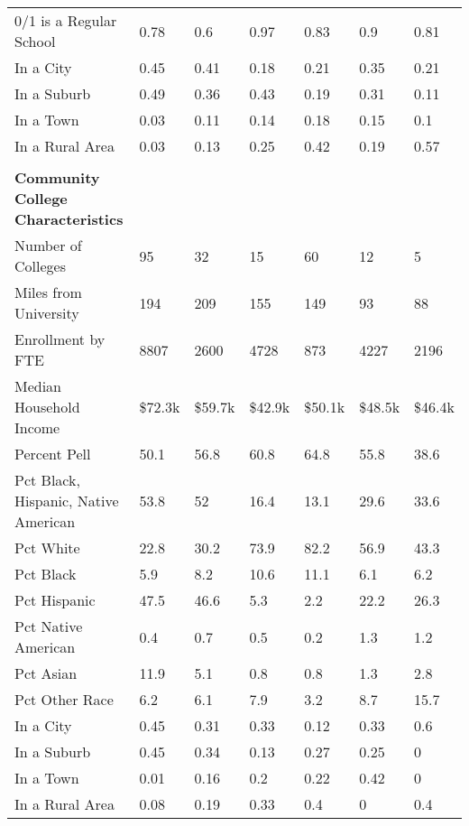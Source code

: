 \begin{longtabu}{X[4.5,l] X[1,c] X[1,c] X[1,c] X[1,c] X[1,c] X[1,c]}
\hspace{0.4cm}0/1 is a Regular School&0.78&0.6&0.97&0.83&0.9&0.81\\%
\hspace{0.4cm}In a City&0.45&0.41&0.18&0.21&0.35&0.21\\%
\hspace{0.4cm}In a Suburb&0.49&0.36&0.43&0.19&0.31&0.11\\%
\hspace{0.4cm}In a Town&0.03&0.11&0.14&0.18&0.15&0.1\\%
\hspace{0.4cm}In a Rural Area&0.03&0.13&0.25&0.42&0.19&0.57\\%
&&&&&&\\%
\textbf{Community College Characteristics}&\textbf{}&\textbf{}&\textbf{}&\textbf{}&\textbf{}&\textbf{}\\%
\hspace{0.4cm}Number of Colleges&95&32&15&60&12&5\\%
\hspace{0.4cm}Miles from University&194&209&155&149&93&88\\%
\hspace{0.4cm}Enrollment by FTE&8807&2600&4728&873&4227&2196\\%
\hspace{0.4cm}Median Household Income&\$72.3k&\$59.7k&\$42.9k&\$50.1k&\$48.5k&\$46.4k\\%
\hspace{0.4cm}Percent Pell&50.1&56.8&60.8&64.8&55.8&38.6\\%
\hspace{0.4cm}Pct Black, Hispanic, Native American&53.8&52&16.4&13.1&29.6&33.6\\%
\hspace{0.4cm}Pct White&22.8&30.2&73.9&82.2&56.9&43.3\\%
\hspace{0.4cm}Pct Black&5.9&8.2&10.6&11.1&6.1&6.2\\%
\hspace{0.4cm}Pct Hispanic&47.5&46.6&5.3&2.2&22.2&26.3\\%
\hspace{0.4cm}Pct Native American&0.4&0.7&0.5&0.2&1.3&1.2\\%
\hspace{0.4cm}Pct Asian&11.9&5.1&0.8&0.8&1.3&2.8\\%
\hspace{0.4cm}Pct Other Race&6.2&6.1&7.9&3.2&8.7&15.7\\%
\hspace{0.4cm}In a City&0.45&0.31&0.33&0.12&0.33&0.6\\%
\hspace{0.4cm}In a Suburb&0.45&0.34&0.13&0.27&0.25&0\\%
\hspace{0.4cm}In a Town&0.01&0.16&0.2&0.22&0.42&0\\%
\hspace{0.4cm}In a Rural Area&0.08&0.19&0.33&0.4&0&0.4\\%
\end{longtabu}
